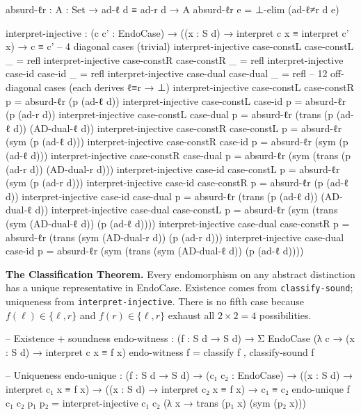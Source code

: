 \documentclass[11pt,a4paper]{article}
\begin{document}
\begin{code}
  absurd-ℓr : {A : Set} → ad-ℓ d ≡ ad-r d → A
  absurd-ℓr e = ⊥-elim (ad-ℓ≠r d e)

  interpret-injective :
    (c c' : EndoCase) →
    ((x : S d) → interpret c x ≡ interpret c' x) →
    c ≡ c'
  -- 4 diagonal cases (trivial)
  interpret-injective case-constL case-constL _ = refl
  interpret-injective case-constR case-constR _ = refl
  interpret-injective case-id     case-id     _ = refl
  interpret-injective case-dual   case-dual   _ = refl
  -- 12 off-diagonal cases (each derives ℓ≡r → ⊥)
  interpret-injective case-constL case-constR p =
    absurd-ℓr (p (ad-ℓ d))
  interpret-injective case-constL case-id     p =
    absurd-ℓr (p (ad-r d))
  interpret-injective case-constL case-dual   p =
    absurd-ℓr (trans (p (ad-ℓ d)) (AD-dual-ℓ d))
  interpret-injective case-constR case-constL p =
    absurd-ℓr (sym (p (ad-ℓ d)))
  interpret-injective case-constR case-id     p =
    absurd-ℓr (sym (p (ad-ℓ d)))
  interpret-injective case-constR case-dual   p =
    absurd-ℓr (sym (trans (p (ad-r d)) (AD-dual-r d)))
  interpret-injective case-id     case-constL p =
    absurd-ℓr (sym (p (ad-r d)))
  interpret-injective case-id     case-constR p =
    absurd-ℓr (p (ad-ℓ d))
  interpret-injective case-id     case-dual   p =
    absurd-ℓr (trans (p (ad-ℓ d)) (AD-dual-ℓ d))
  interpret-injective case-dual   case-constL p =
    absurd-ℓr (sym (trans (sym (AD-dual-ℓ d)) (p (ad-ℓ d))))
  interpret-injective case-dual   case-constR p =
    absurd-ℓr (trans (sym (AD-dual-r d)) (p (ad-r d)))
  interpret-injective case-dual   case-id     p =
    absurd-ℓr (sym (trans (sym (AD-dual-ℓ d)) (p (ad-ℓ d))))
\end{code}

\textbf{The Classification Theorem.}
Every endomorphism on any abstract distinction has a unique
representative in EndoCase. Existence comes from \texttt{classify-sound};
uniqueness from \texttt{interpret-injective}. There is no fifth case
because $f(\ell) \in \{\ell, r\}$ and $f(r) \in \{\ell, r\}$ exhaust
all $2 \times 2 = 4$ possibilities.

\begin{code}
  -- Existence + soundness
  endo-witness : (f : S d → S d) →
                 Σ EndoCase (λ c → (x : S d) → interpret c x ≡ f x)
  endo-witness f = classify f , classify-sound f

  -- Uniqueness
  endo-unique : (f : S d → S d) →
                (c₁ c₂ : EndoCase) →
                ((x : S d) → interpret c₁ x ≡ f x) →
                ((x : S d) → interpret c₂ x ≡ f x) →
                c₁ ≡ c₂
  endo-unique f c₁ c₂ p₁ p₂ =
    interpret-injective c₁ c₂ (λ x → trans (p₁ x) (sym (p₂ x)))
\end{code}
\end{document}
